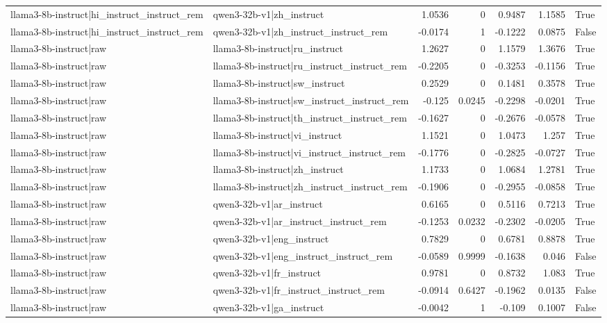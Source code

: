 \begin{table}
\begin{tabular}{l l r r r r l}
llama3-8b-instruct|hi_instruct_instruct_rem & qwen3-32b-v1|zh_instruct & 1.0536 & 0 & 0.9487 & 1.1585 & True \\
llama3-8b-instruct|hi_instruct_instruct_rem & qwen3-32b-v1|zh_instruct_instruct_rem & -0.0174 & 1 & -0.1222 & 0.0875 & False \\
llama3-8b-instruct|raw & llama3-8b-instruct|ru_instruct & 1.2627 & 0 & 1.1579 & 1.3676 & True \\
llama3-8b-instruct|raw & llama3-8b-instruct|ru_instruct_instruct_rem & -0.2205 & 0 & -0.3253 & -0.1156 & True \\
llama3-8b-instruct|raw & llama3-8b-instruct|sw_instruct & 0.2529 & 0 & 0.1481 & 0.3578 & True \\
llama3-8b-instruct|raw & llama3-8b-instruct|sw_instruct_instruct_rem & -0.125 & 0.0245 & -0.2298 & -0.0201 & True \\
llama3-8b-instruct|raw & llama3-8b-instruct|th_instruct_instruct_rem & -0.1627 & 0 & -0.2676 & -0.0578 & True \\
llama3-8b-instruct|raw & llama3-8b-instruct|vi_instruct & 1.1521 & 0 & 1.0473 & 1.257 & True \\
llama3-8b-instruct|raw & llama3-8b-instruct|vi_instruct_instruct_rem & -0.1776 & 0 & -0.2825 & -0.0727 & True \\
llama3-8b-instruct|raw & llama3-8b-instruct|zh_instruct & 1.1733 & 0 & 1.0684 & 1.2781 & True \\
llama3-8b-instruct|raw & llama3-8b-instruct|zh_instruct_instruct_rem & -0.1906 & 0 & -0.2955 & -0.0858 & True \\
llama3-8b-instruct|raw & qwen3-32b-v1|ar_instruct & 0.6165 & 0 & 0.5116 & 0.7213 & True \\
llama3-8b-instruct|raw & qwen3-32b-v1|ar_instruct_instruct_rem & -0.1253 & 0.0232 & -0.2302 & -0.0205 & True \\
llama3-8b-instruct|raw & qwen3-32b-v1|eng_instruct & 0.7829 & 0 & 0.6781 & 0.8878 & True \\
llama3-8b-instruct|raw & qwen3-32b-v1|eng_instruct_instruct_rem & -0.0589 & 0.9999 & -0.1638 & 0.046 & False \\
llama3-8b-instruct|raw & qwen3-32b-v1|fr_instruct & 0.9781 & 0 & 0.8732 & 1.083 & True \\
llama3-8b-instruct|raw & qwen3-32b-v1|fr_instruct_instruct_rem & -0.0914 & 0.6427 & -0.1962 & 0.0135 & False \\
llama3-8b-instruct|raw & qwen3-32b-v1|ga_instruct & -0.0042 & 1 & -0.109 & 0.1007 & False \\

\end{tabular}
\end{table}
